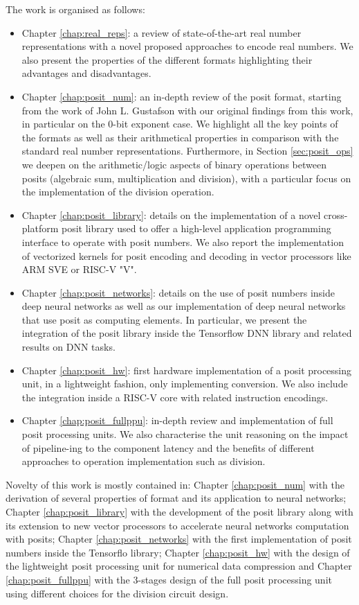 The work is organised as follows: 
\begin{itemize}
    \item Chapter \ref{chap:real_reps}: a review of state-of-the-art real number representations with a novel proposed approaches to encode real numbers. We also present the properties of the different formats highlighting their advantages and disadvantages. 
    \item Chapter \ref{chap:posit_num}: an in-depth review of the posit format, starting from the work of John L. Gustafson with our original findings from this work, in particular on the 0-bit exponent case. We highlight all the key points of the formats as well as their arithmetical properties in comparison with the standard real number representations. Furthermore, in Section \ref{sec:posit_ops} we deepen on the arithmetic/logic aspects of binary operations between posits (algebraic sum, multiplication and division), with a particular focus on the implementation of the division operation.
    \item Chapter \ref{chap:posit_library}: details on the implementation of a novel cross-platform posit library used to offer a high-level application programming interface to operate with posit numbers. We also report the implementation of vectorized kernels for posit encoding and decoding in vector processors like ARM SVE or RISC-V "V".
    \item Chapter \ref{chap:posit_networks}: details on the use of posit numbers inside deep neural networks as well as our implementation of deep neural networks that use posit as computing elements. In particular, we present the integration of the posit library inside the Tensorflow DNN library and related results on DNN tasks.
    \item Chapter \ref{chap:posit_hw}: first hardware implementation of a posit processing unit, in a lightweight fashion, only implementing conversion. We also include the integration inside a RISC-V core with related instruction encodings.
    \item Chapter \ref{chap:posit_fullppu}: in-depth review and implementation of full posit processing units. We also characterise the unit reasoning on the impact of pipeline-ing to the component latency and the benefits of different approaches to operation implementation such as division.
    
\end{itemize}

Novelty of this work is mostly contained in: Chapter \ref{chap:posit_num} with the derivation of several properties of  format and its application to neural networks; Chapter \ref{chap:posit_library} with the development of the posit library along with its extension to new vector processors to accelerate neural networks computation with posits; Chapter \ref{chap:posit_networks} with the first implementation of posit numbers inside the Tensorflo library; Chapter \ref{chap:posit_hw} with the design of the lightweight posit processing unit for numerical data compression and Chapter  \ref{chap:posit_fullppu} with the 3-stages design of the full posit processing unit using different choices for the division circuit design.

